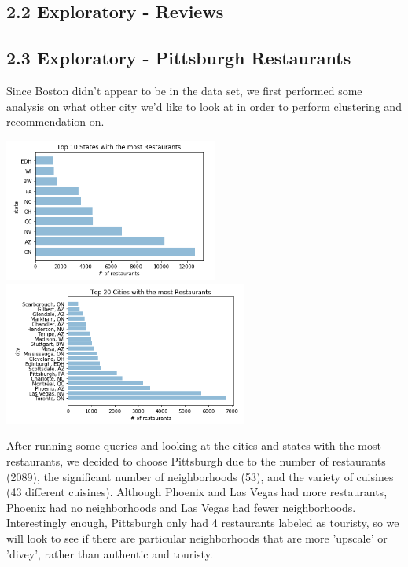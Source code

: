\documentclass{neu_handout}
\begin{document}
\subsection*{2.2 Exploratory - Reviews}

\subsection*{2.3 Exploratory - Pittsburgh Restaurants}

   Since Boston didn't appear to be in the data set, we first performed some analysis on what other city we'd like to look at in order to perform clustering and recommendation on.
   
\begin{center}
\includegraphics[width=70mm,scale=0.5]{states}
\includegraphics[width=80mm,scale=0.5]{cities}
\end{center}
   
After running some queries and looking at the cities and states with the most restaurants, we decided to choose Pittsburgh due to the number of restaurants (2089), the significant number of neighborhoods (53), and the variety of cuisines (43 different cuisines). Although Phoenix and Las Vegas had more restaurants, Phoenix had no neighborhoods and Las Vegas had fewer neighborhoods. Interestingly enough, Pittsburgh only had 4 restaurants labeled as touristy, so we will look to see if there are particular neighborhoods that are more 'upscale' or 'divey', rather than authentic and touristy.
\end{document}
